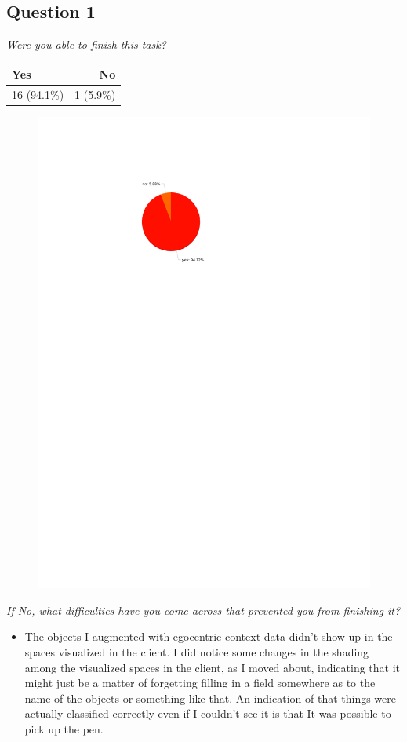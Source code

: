 \subsection{Question 1}
\emph{Were you able to finish this task?}
\begin{table}[H]
	\begin{center}
		\small \begin{tabular*}{0.35\columnwidth}{lr}
			\\ \hline \hline
			Yes & No \\ \hline \hline

		 	16 (94.1\%) & 1 (5.9\%)\\ \hline
		\end{tabular*}
	\end{center}
\end{table}

\begin{figure}[H]
	\centering
	\includegraphics[width=0.5\linewidth]{gfx/Chapter_EvaluationResults/ChildproofTask/question1}
\end{figure}

\emph{If No, what difficulties have you come across that prevented you from finishing it?}
\begin{itemize}
	\item The objects I augmented with egocentric context data didn't show up in the spaces visualized in the client. I did notice some changes in the shading among the visualized spaces in the client, as I moved about, indicating that it might just be a matter of forgetting filling in a field somewhere as to the name of the objects or something like that. An indication of that things were actually classified correctly even if I couldn't see it is that It was possible to pick up the pen.
\end{itemize}


